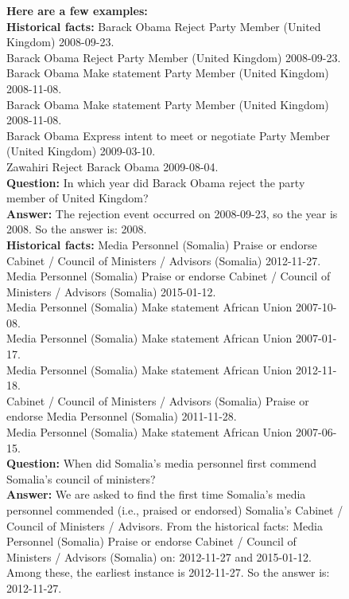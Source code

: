\documentclass[11pt]{article}
\begin{document}
\begin{figure}[!h]
\begin{tcolorbox}
{\vspace{0.5em}
\textbf{Here are a few examples:}\\[1em]
\textbf{Historical facts:}
Barack Obama Reject Party Member (United Kingdom) 2008-09-23. \\
Barack Obama Reject Party Member (United Kingdom) 2008-09-23. \\
Barack Obama Make statement Party Member (United Kingdom) 2008-11-08. \\
Barack Obama Make statement Party Member (United Kingdom) 2008-11-08. \\
Barack Obama Express intent to meet or negotiate Party Member (United Kingdom) 2009-03-10. \\
Zawahiri Reject Barack Obama 2009-08-04. \\
\textbf{Question:} In which year did Barack Obama reject the party member of United Kingdom? \\
\textbf{Answer:} The rejection event occurred on 2008-09-23, so the year is 2008. So the answer is: 2008. \\[0.5em]
\textbf{Historical facts:}
Media Personnel (Somalia) Praise or endorse Cabinet / Council of Ministers / Advisors (Somalia) 2012-11-27. \\
Media Personnel (Somalia) Praise or endorse Cabinet / Council of Ministers / Advisors (Somalia) 2015-01-12. \\
Media Personnel (Somalia) Make statement African Union 2007-10-08. \\
Media Personnel (Somalia) Make statement African Union 2007-01-17. \\
Media Personnel (Somalia) Make statement African Union 2012-11-18. \\
Cabinet / Council of Ministers / Advisors (Somalia) Praise or endorse Media Personnel (Somalia) 2011-11-28. \\
Media Personnel (Somalia) Make statement African Union 2007-06-15. \\
\textbf{Question:} When did Somalia's media personnel first commend Somalia's council of ministers? \\
\textbf{Answer:} We are asked to find the first time Somalia's media personnel commended (i.e., praised or endorsed) Somalia's Cabinet / Council of Ministers / Advisors. From the historical facts: Media Personnel (Somalia) Praise or endorse Cabinet / Council of Ministers / Advisors (Somalia) on: 2012-11-27 and 2015-01-12. Among these, the earliest instance is 2012-11-27. So the answer is: 2012-11-27. \\[0.5em]
}
\end{tcolorbox}
\end{figure}
\end{document}
